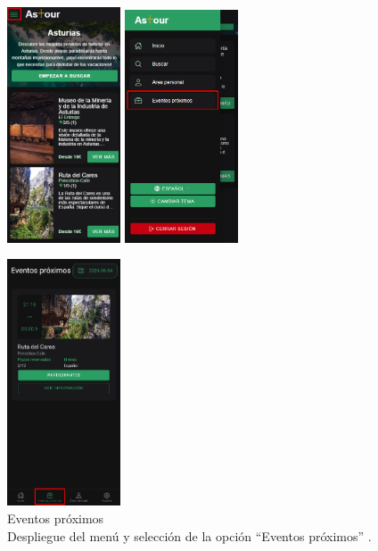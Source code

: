 \begin{figure}[H]
	\centering
	\begin{minipage}{0.45\textwidth}
		\centering
		\includegraphics[width=0.3\textwidth]{7-Construccion/Manuales/mobile/menu marcado.png}
		\includegraphics[width=0.3\textwidth]{7-Construccion/Manuales/mobile/eventos proximos marcado.png}
		\caption{Eventos próximos \\ Despliegue del menú y selección de la opción “Eventos próximos” .}
		\label{fig:eventos-proximos-opcion-movil}
	\end{minipage}
	\hfill
	\begin{minipage}{0.45\textwidth}
		\centering
		\includegraphics[width=0.3\textwidth]{7-Construccion/Manuales/app/eventos marcado.png}

\end{minipage}
\end{figure}
